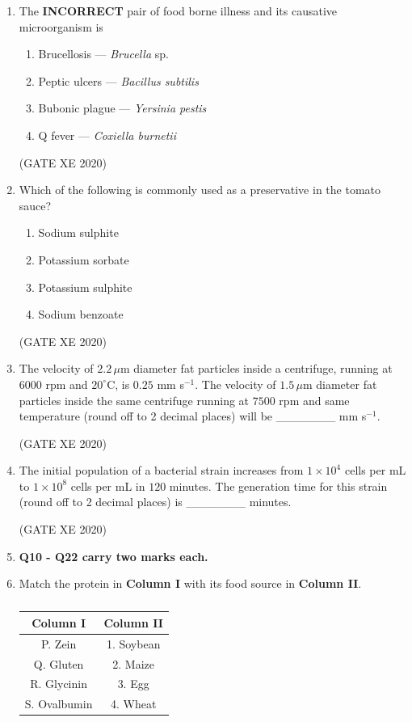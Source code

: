 \documentclass[12pt]{article}
\begin{document}
\begin{enumerate}
\item The \textbf{INCORRECT} pair of food borne illness and its causative microorganism is
\begin{enumerate}
\item Brucellosis — \textit{Brucella} sp.
\item Peptic ulcers — \textit{Bacillus subtilis}
\item Bubonic plague — \textit{Yersinia pestis}
\item Q fever — \textit{Coxiella burnetii}
\end{enumerate}
(GATE XE 2020)

\item Which of the following is commonly used as a preservative in the tomato sauce?
\begin{enumerate}
\item Sodium sulphite
\item Potassium sorbate
\item Potassium sulphite
\item Sodium benzoate
\end{enumerate}
(GATE XE 2020)

\item The velocity of $2.2\,\mu$m diameter fat particles inside a centrifuge, running at $6000$ rpm and $20^{\circ}\mathrm{C}$, is $0.25$ mm s$^{-1}$. The velocity of $1.5\,\mu$m diameter fat particles inside the same centrifuge running at $7500$ rpm and same temperature (round off to 2 decimal places) will be \_\_\_\_\_\_\_ mm s$^{-1}$.  

(GATE XE 2020)

\item The initial population of a bacterial strain increases from $1\times 10^{4}$ cells per mL to $1\times 10^{8}$ cells per mL in $120$ minutes. The generation time for this strain (round off to 2 decimal places) is \_\_\_\_\_\_\_ minutes. 

(GATE XE 2020)

\item[] \textbf{Q10 - Q22 carry two marks each.}
\item Match the protein in \textbf{Column I} with its food source in \textbf{Column II}.
\begin{table}[H]
\centering
\caption{}
\label{}
\begin{tabular}{|c|c|}
\hline
Column I & Column II \\
\hline
P. Zein & 1. Soybean \\
Q. Gluten & 2. Maize \\
R. Glycinin & 3. Egg \\
S. Ovalbumin & 4. Wheat \\
\hline
\end{tabular}
\end{table}


\end{enumerate}
\end{document}
